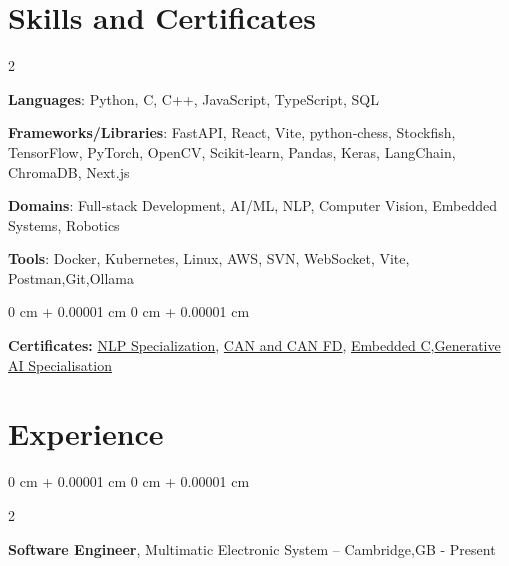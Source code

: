 \documentclass[10pt, letterpaper]{article}
\newenvironment{onecolentry}{
    \begin{adjustwidth}{
        0 cm + 0.00001 cm
    }{
        0 cm + 0.00001 cm
    }
}{
    \end{adjustwidth}
} %
\newenvironment{twocolentry}[2][]{
    \onecolentry
    \def\secondColumn{#2}
    \setcolumnwidth{\fill, 4.5 cm}
    \begin{paracol}{2}
}{
    \switchcolumn \raggedleft \secondColumn
    \end{paracol}
    \endonecolentry
} %
\begin{document}
\section{Skills and Certificates}
\vspace{-0.65em}
        \setlength{\parskip}{0em} %
        \begin{multicols}{2}
        \raggedright
        \textbf{Languages}: Python, C, C++, JavaScript, TypeScript, SQL
        
        \textbf{Frameworks/Libraries}: FastAPI, React, Vite, python‑chess, Stockfish, TensorFlow, PyTorch, OpenCV, Scikit‑learn, Pandas, Keras, LangChain, ChromaDB, Next.js
        

        \columnbreak
        
        \textbf{Domains}: Full‑stack Development, AI/ML, NLP, Computer Vision, Embedded Systems, Robotics
        
        \textbf{Tools}: Docker, Kubernetes, Linux, AWS, SVN, WebSocket, Vite, Postman,Git,Ollama
        
        \end{multicols}
        \vspace{-0.4em}
        \begin{onecolentry}
            \textbf{Certificates:} {\href{https://coursera.org/share/4fff411dc664c33bda2f8c042df38c0a}{NLP Specialization}}, {\href{https://www.udemy.com/certificate/UC-44a5173f-dd25-42d9-bf5e-aa49ad9b2beb/}{CAN and CAN FD}}, {\href{https://www.udemy.com/certificate/UC-85bc7d26-54e9-4643-9e56-22eeea8ba561/}{Embedded C}},{\href{https://coursera.org/share/5a13d8715476222078fb5dda04df936f}{Generative AI Specialisation}}
        \end{onecolentry}
        \vspace{-0.4em}
\section{Experience}
\begin{twocolentry}{
    2023 - Present
}
    \textbf{Software Engineer}, Multimatic Electronic System -- Cambridge,GB\end{twocolentry}
\end{document}
